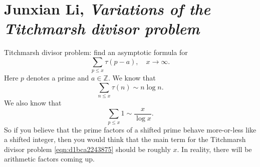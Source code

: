 \documentclass[reqno]{amsart} 
\begin{document}
\section{Junxian Li, \emph{Variations of the Titchmarsh divisor problem}}
Titchmarsh divisor problem: find an asymptotic formula for
\begin{equation}\label{eqn:d1bca2243875}
  \sum_{p \leq x} \tau (p - a),
  \quad
  x \rightarrow \infty.
\end{equation}
Here $p$ denotes a prime and $a \in \mathbb{Z}$.  We know that
\begin{equation*}
  \sum_{n \leq x} \tau (n) \sim n \log n.
\end{equation*}
We also know that
\begin{equation*}
  \sum_{p \leq x} 1 \sim \frac{x}{\log x}.
\end{equation*}
So if you believe that the prime factors of a shifted prime behave more-or-less like a shifted integer, then you would think that the main term for the Titchmarsh divisor problem \eqref{eqn:d1bca2243875} should be roughly $x$.  In reality, there will be arithmetic factors coming up.
\end{document}
